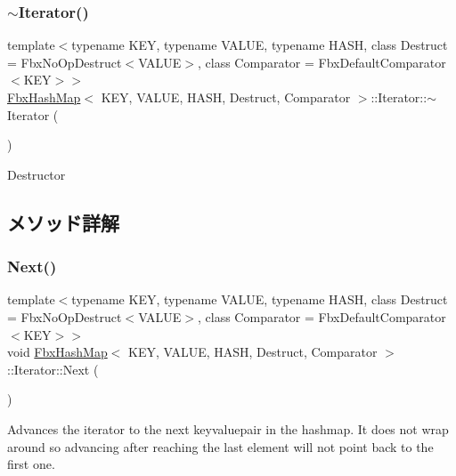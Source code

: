 \subsubsection{\texorpdfstring{$\sim$\+Iterator()}{~Iterator()}}
{\footnotesize\ttfamily template$<$typename K\+EY, typename V\+A\+L\+UE, typename H\+A\+SH, class Destruct = Fbx\+No\+Op\+Destruct$<$\+V\+A\+L\+U\+E$>$, class Comparator = Fbx\+Default\+Comparator$<$\+K\+E\+Y$>$$>$ \\
\hyperlink{class_fbx_hash_map}{Fbx\+Hash\+Map}$<$ K\+EY, V\+A\+L\+UE, H\+A\+SH, Destruct, Comparator $>$\+::Iterator\+::$\sim$\+Iterator (\begin{DoxyParamCaption}{ }\end{DoxyParamCaption})}

Destructor 

\subsection{メソッド詳解}
\mbox{\label{class_fbx_hash_map_1_1_iterator_a258bdc83ad94b6b15dae8c8206123fdb}} 
\subsubsection{\texorpdfstring{Next()}{Next()}}
{\footnotesize\ttfamily template$<$typename K\+EY, typename V\+A\+L\+UE, typename H\+A\+SH, class Destruct = Fbx\+No\+Op\+Destruct$<$\+V\+A\+L\+U\+E$>$, class Comparator = Fbx\+Default\+Comparator$<$\+K\+E\+Y$>$$>$ \\
void \hyperlink{class_fbx_hash_map}{Fbx\+Hash\+Map}$<$ K\+EY, V\+A\+L\+UE, H\+A\+SH, Destruct, Comparator $>$\+::Iterator\+::\+Next (\begin{DoxyParamCaption}{ }\end{DoxyParamCaption})}

Advances the iterator to the next keyvaluepair in the hashmap. It does not wrap around so advancing after reaching the last element will not point back to the first one. \mbox{\label{class_fbx_hash_map_1_1_iterator_a092b6ea2a37710015462f1a9ad986741}} 
